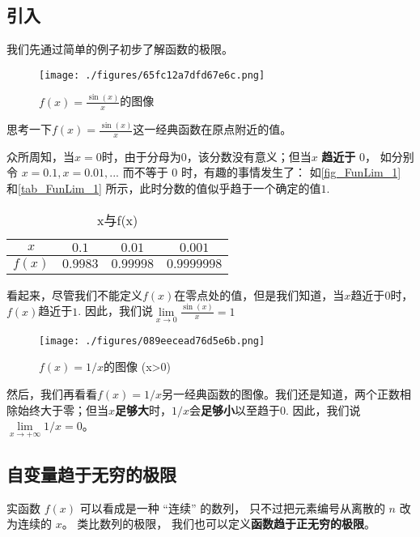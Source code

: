 

\subsection{引入}
我们先通过简单的例子初步了解函数的极限。
\begin{example}{}\label{ex_FunLim_1}

\begin{figure}[ht]
\centering
\texttt{[image: ./figures/65fc12a7dfd67e6c.png]}
\caption{$f(x)=\frac{\sin(x)}{x}$的图像} \label{fig_FunLim_1}
\end{figure}
思考一下$f(x)=\frac{\sin(x)}{x}$这一经典函数在原点附近的值。

众所周知，当$x=0$时，由于分母为$0$，该分数没有意义；但当$x$ \textbf{趋近于} $0$， 如分别令 $x=0.1,x=0.01,...$ 而不等于 $0$ 时，有趣的事情发生了： 如\autoref{fig_FunLim_1} 和\autoref{tab_FunLim_1} 所示，此时分数的值似乎趋于一个确定的值$1$.

\begin{table}[ht]
\centering
\caption{x与f(x)}\label{tab_FunLim_1}
\begin{tabular}{|c|c|c|c|}
\hline
$x$ & $0.1$ & $0.01$ & $0.001$ \\
\hline
$f(x)$ & $0.9983$ & $0.99998$ & $0.9999998$ \\
\hline
\end{tabular}
\end{table}
看起来，尽管我们不能定义$f(x)$在零点处的值，但是我们知道，当$x$趋近于$0$时，$f(x)$趋近于$1$. 因此，我们说$\lim\limits_{x\to0}\frac{\sin(x)}{x}=1$
\end{example}

\begin{example}{}
\begin{figure}[ht]
\centering
\texttt{[image: ./figures/089eecead76d5e6b.png]}
\caption{$f(x)=1/x$的图像 (x>0)} \label{fig_FunLim_2}
\end{figure}
然后，我们再看看$f(x)=1/x$另一经典函数的图像。我们还是知道，两个正数相除始终大于零；但当$x$\textbf{足够大}时，$1/x$会\textbf{足够小}以至趋于$0$. 因此，我们说$\lim\limits_{x\to+\infty}1/x=0$。
\end{example}

\subsection{自变量趋于无穷的极限}
实函数 $f(x)$ 可以看成是一种 “连续” 的数列， 只不过把元素编号从离散的 $n$ 改为连续的 $x$。 类比数列的极限， 我们也可以定义\textbf{函数趋于正无穷的极限}。

